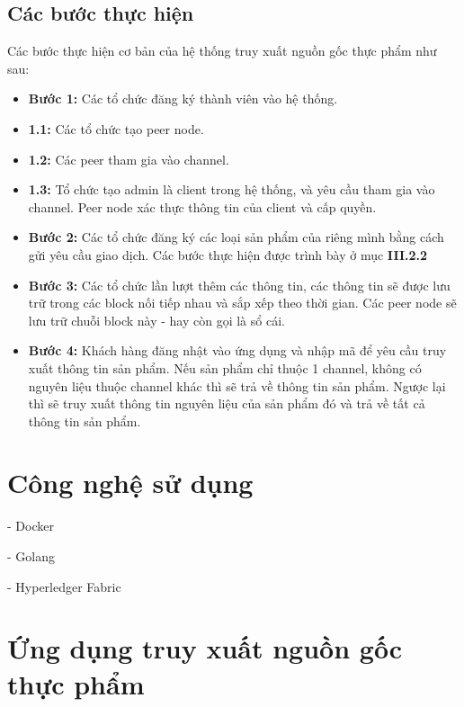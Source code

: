 \subsection{Các bước thực hiện}
Các bước thực hiện cơ bản của hệ thống truy xuất nguồn gốc thực phẩm như sau:
\begin{itemize}
    \item \textbf{Bước 1:} Các tổ chức đăng ký thành viên vào hệ thống.
        \item \textbf{1.1:} Các tổ chức tạo peer node. 
        \item \textbf{1.2:} Các peer tham gia vào channel.
        \item \textbf{1.3:} Tổ chức tạo admin là client trong hệ thống, và yêu cầu
        tham gia vào channel. Peer node xác thực thông tin của client và cấp quyền.
    \item \textbf{Bước 2:} Các tổ chức đăng ký các loại sản phẩm của riêng mình bằng cách 
    gửi yêu cầu giao dịch. Các bước thực hiện được trình bày ở mục \textbf{III.2.2}
    \item \textbf{Bước 3:} Các tổ chức lần lượt thêm các thông tin, các thông tin sẽ được
    lưu trữ trong các block nối tiếp nhau và sắp xếp theo thời gian. Các peer node sẽ lưu 
    trữ chuỗi block này - hay còn gọi là sổ cái.
    \item \textbf{Bước 4:} Khách hàng đăng nhật vào ứng dụng và nhập mã để yêu cầu truy xuất
    thông tin sản phẩm. Nếu sản phẩm chỉ thuộc 1 channel, không có nguyên liệu thuộc channel
    khác thì sẽ trả về thông tin sản phẩm. Ngược lại thì sẽ truy xuất thông tin nguyên liệu
    của sản phẩm đó và trả về tất cả thông tin sản phẩm.
\end{itemize}

\section{Công nghệ sử dụng}
- Docker

- Golang

- Hyperledger Fabric \cite{Introduction}

\section{Ứng dụng truy xuất nguồn gốc thực phẩm}
